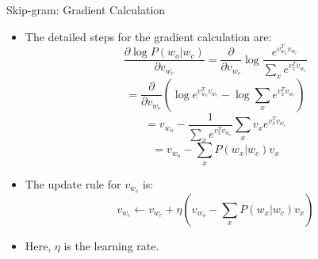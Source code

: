 \documentclass[serif, aspectratio=169]{beamer}
\begin{document}
\begin{frame}{Skip-gram: Gradient Calculation}
    \begin{itemize}
        \item The detailed steps for the gradient calculation are:
        \[
        \frac{\partial \log P(w_o | w_c)}{\partial v_{w_c}} = \frac{\partial}{\partial v_{w_c}} \log \frac{e^{v_{w_o}^T v_{w_c}}}{\sum_x e^{v_x^T v_{w_c}}}
        \]
        \[
        = \frac{\partial}{\partial v_{w_c}} \left( \log e^{v_{w_o}^T v_{w_c}} - \log \sum_x e^{v_x^T v_{w_c}} \right)
        \]
        \[
        = v_{w_o} - \frac{1}{\sum_x e^{v_x^T v_{w_c}}} \sum_x v_x e^{v_x^T v_{w_c}}
        \]
        \[
        = v_{w_o} - \sum_x P(w_x | w_c) v_x
        \]
        \item The update rule for \(v_{w_c}\) is:
        \[
        v_{w_c} \leftarrow v_{w_c} + \eta \left( v_{w_o} - \sum_x P(w_x | w_c) v_x \right)
        \]
        \item Here, \(\eta\) is the learning rate.
    \end{itemize}
\end{frame}


\end{document}
